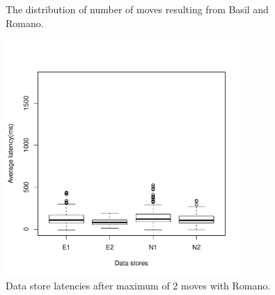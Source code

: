\begin{figure}[!t]
\centering
{}
\captionsetup{format=myformat}
\caption{
The distribution of number of moves resulting from Basil and Romano.
}
\label{moves}
\end{figure}

\begin{figure}[!t]
\centering
\includegraphics[width=0.8\textwidth]{figure/romano_latency_2moves.pdf}
\captionsetup{format=myformat}
\caption{Data store latencies after maximum of 2 moves with Romano.}
\label{two}
\end{figure}

